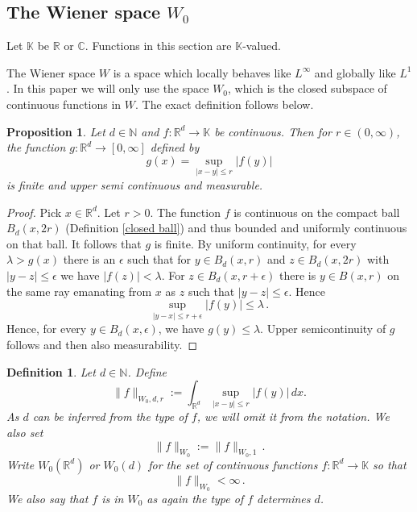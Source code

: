\documentclass[12pt,reqno]{amsart}
\theoremstyle{plain}
\newtheorem{proposition}[theorem]{Proposition}
\newtheorem{definition}[theorem]{Definition}
\numberwithin{equation}{section}
\theoremstyle{remark}
\newcommand{\R}{{\mathbb R}}
\newcommand{\N}{{\mathbb N}}
\newcommand{\C}{{\mathbb C}}
\begin{document}
\subsection{The Wiener space \texorpdfstring{$W_0$}{}}
Let $\mathbb{K}$ be $\R$ or $\C$.
Functions in this section are $\mathbb{K}$-valued.


The  Wiener space $W$ is a space which locally behaves like $L^\infty$ and globally like $L^1$
\cite{Wiener32,Groechenig}. In this paper we will only use the space $W_0$, which is the closed subspace of continuous functions in $W$.
The exact definition follows below.

\begin{proposition}\label{auto:local-supremum-measurability}
Let $d\in \N$ and $f:\R^d\to \mathbb{K}$ be continuous.
Then for $r\in (0,\infty)$, the function $g:\R^d\to [0,\infty]$  defined by
\begin{equation}\label{auto:local-supremum-function}
    g(x)=\sup_{|x-y|\le r}|f(y)|
\end{equation}
is finite and upper semi continuous and measurable.
\end{proposition}
\begin{proof}
 Pick $x\in \R^d$. Let $r>0$.
 The function $f$ is continuous on the compact ball $B_d(x,2r)$ (Definition \ref{closed ball}) and thus bounded and uniformly continuous on that ball. It follows that $g$ is finite. By uniform continuity, for every $\lambda>g(x)$ there is an $\epsilon$ such that for $y\in B_d(x,r)$ and $z\in B_d(x,2r)$ with $|y-z|\le \epsilon$ we have
 $|f(z)|<\lambda$. For $z\in B_d(x,r+\epsilon)$
 there is $y\in B(x,r)$ on the same ray emanating from $x$ as $z$ such that $|y-z|\le \epsilon$.
 Hence
 \begin{equation}
     \sup_{|y-x|\le r+\epsilon}|f(y)|\le \lambda \, .
 \end{equation}
 Hence, for  every $y\in B_d(x,\epsilon)$, we have
 $g(y)\le \lambda$. Upper semicontinuity of $g$ follows and then also measurability.
 \end{proof}

\begin{definition}\label{auto:Wiener-space-definition}
Let $d\in \N$.  Define
\begin{equation}\label{auto:Wiener-local-norm}
\|f\|_{W_0,d,r}:=    \int_{\R^d} \sup_{|x-y|\le r} |f(y)|\,dx.
\end{equation}
As $d$ can be inferred from the type of $f$, we
will omit it from the notation.
We also set
\begin{equation}\label{auto:Wiener-norm}
    \|f\|_{W_0}:=\|f\|_{W_0,1}\, .
\end{equation}
Write $W_0(\R^d)$ or $W_0(d)$ for the set of continuous functions $f:\R^d\to\mathbb{K}$ so that
\begin{equation}\label{auto:Wiener-space-finiteness}  \|f\|_{W_0}< \infty\, . \end{equation}
We also say that $f$ is in $W_0$ as again the type of $f$
determines $d$.
\end{definition}
\end{document}
